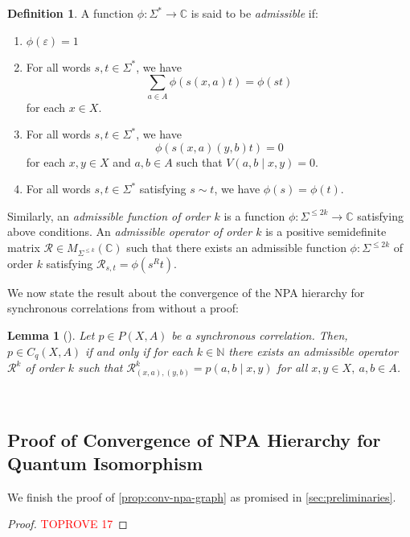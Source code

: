 \documentclass[11pt,a4paper]{article}
\theoremstyle{plain}
\newtheorem{lem}[thm]{Lemma}
\theoremstyle{remark}
\theoremstyle{definition}
\newtheorem{definition}[thm]{Definition}
\renewcommand\epsilon\varepsilon
\begin{document}
\begin{definition}
A function $\phi: \Sigma^* \to \mathbb{C}$ is said to be \emph{admissible} if:
\begin{enumerate}
    \item $\phi(\epsilon) = 1$
    \item For all words $s,t \in \Sigma^*$, we have 
    $$\sum_{a \in A}\phi(s(x,a)t) = \phi(st)$$
    for each $x \in X$.
    \item For all words $s,t \in \Sigma^*$, we have 
    $$\phi(s(x,a)(y,b)t) = 0$$
    for each $x,y \in X$ and $a,b \in A$ such that $V(a,b\mid x,y) = 0$.
    \item For all words $s,t \in \Sigma^*$ satisfying $s \sim t$, we have $\phi(s) = \phi(t)$.
\end{enumerate}

Similarly, an \emph{admissible function of order $k$} is a function $\phi: \Sigma^{\leq 2k} \to \mathbb{C}$ satisfying above conditions. An \emph{admissible operator of order $k$} is a positive semidefinite matrix $\mathcal{R} \in M_{\Sigma^{\leq k}}(\mathbb{C})$ such that there exists an admissible function $\phi: \Sigma^{\leq 2k}$ of order $k$ satisfying $\mathcal{R}_{s,t} = \phi(s^Rt).$ 
\end{definition}

We now state the result about the convergence of the NPA hierarchy for synchronous correlations from \cite{russell_synchronous_2023} without a proof: 

\begin{lem}[{\cite[Corollary 2]{russell_synchronous_2023}}]\label{lem:conv-npa-corr}
Let $p \in P(X,A)$ be a synchronous correlation. Then, $p \in C_q(X,A)$ if and only if for each $k \in \mathbb{N}$ there exists an admissible operator $\mathcal{R}^k$ of order $k$ such that $\mathcal{R}^k_{(x,a), (y,b)} = p(a,b\mid x,y)$ for all $x,y \in X, \ a,b \in A$.
\end{lem} \

\subsection{Proof of Convergence of NPA Hierarchy for Quantum Isomorphism}

We finish the proof of \ref{prop:conv-npa-graph} as promised in \cref{sec:preliminaries}. 

\begin{proof}\textcolor{red}{TOPROVE 17}\end{proof}
\end{document}
